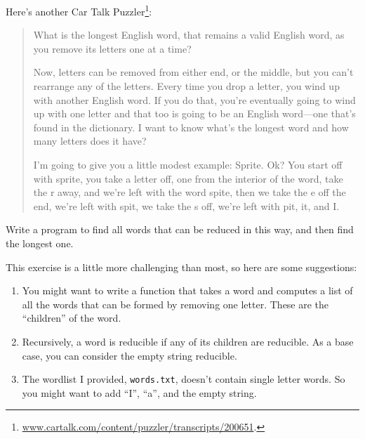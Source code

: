 \documentclass[10pt]{book}
\begin{document}
{\begin{ex}
\begin{enumerate}
\end{enumerate}
\end{ex}



\begin{ex}


Here's another Car Talk Puzzler\footnote{
\url{www.cartalk.com/content/puzzler/transcripts/200651}.}:

\begin{quote}
What is the longest English word, that remains a valid English word,
as you remove its letters one at a time?

Now, letters can be removed from either end, or the middle, but you
can't rearrange any of the letters. Every time you drop a letter, you
wind up with another English word. If you do that, you're eventually
going to wind up with one letter and that too is going to be an
English word---one that's found in the dictionary. I want to know
what's the longest word and how many letters does it
have?

I'm going to give you a little modest example: Sprite. Ok? You start
off with sprite, you take a letter off, one from the interior of the
word, take the r away, and we're left with the word spite, then we
take the e off the end, we're left with spit, we take the s off, we're
left with pit, it, and I.
\end{quote}


Write a program to find all words that can be reduced in this way,
and then find the longest one.

This exercise is a little more challenging than most, so here are
some suggestions:

\begin{enumerate}

\item You might want to write a function that takes a word and
  computes a list of all the words that can be formed by removing one
  letter.  These are the ``children'' of the word.


\item Recursively, a word is reducible if any of its children
are reducible.  As a base case, you can consider the empty
string reducible.

\item The wordlist I provided, {\tt words.txt}, doesn't
contain single letter words.  So you might want to add
``I'', ``a'', and the empty string.


\end{enumerate}
\end{ex}}
\end{document}
